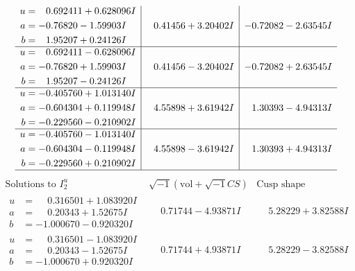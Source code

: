 \documentclass[1p]{elsarticle_modified}
\theoremstyle{definition}
\newcommand{\I}{\sqrt{-1}}
\begin{document}
$$\begin{array}{c|c|c}
\begin{aligned}
u &= \phantom{-}0.692411 + 0.628096 I \\
a &= -0.76820 - 1.59903 I \\
b &= \phantom{-}1.95207 + 0.24126 I\end{aligned}
 & \phantom{-}0.41456 + 3.20402 I & -0.72082 - 2.63545 I \\ \hline\begin{aligned}
u &= \phantom{-}0.692411 - 0.628096 I \\
a &= -0.76820 + 1.59903 I \\
b &= \phantom{-}1.95207 - 0.24126 I\end{aligned}
 & \phantom{-}0.41456 - 3.20402 I & -0.72082 + 2.63545 I \\ \hline\begin{aligned}
u &= -0.405760 + 1.013140 I \\
a &= -0.604304 + 0.119948 I \\
b &= -0.229560 - 0.210902 I\end{aligned}
 & \phantom{-}4.55898 + 3.61942 I & \phantom{-}1.30393 - 4.94313 I \\ \hline\begin{aligned}
u &= -0.405760 - 1.013140 I \\
a &= -0.604304 - 0.119948 I \\
b &= -0.229560 + 0.210902 I\end{aligned}
 & \phantom{-}4.55898 - 3.61942 I & \phantom{-}1.30393 + 4.94313 I\\
 \hline 
 \end{array}$$\newpage$$\begin{array}{c|c|c}  
\text{Solutions to }I^u_{2}& \I (\text{vol} + \sqrt{-1}CS) & \text{Cusp shape}\\
 \hline 
\begin{aligned}
u &= \phantom{-}0.316501 + 1.083920 I \\
a &= \phantom{-}0.20343 + 1.52675 I \\
b &= -1.000670 - 0.920320 I\end{aligned}
 & \phantom{-}0.71744 - 4.93871 I & \phantom{-}5.28229 + 3.82588 I \\ \hline\begin{aligned}
u &= \phantom{-}0.316501 - 1.083920 I \\
a &= \phantom{-}0.20343 - 1.52675 I \\
b &= -1.000670 + 0.920320 I\end{aligned}
 & \phantom{-}0.71744 + 4.93871 I & \phantom{-}5.28229 - 3.82588 I \\ \hline\begin{aligned}

\end{aligned}
\end{array}$$
\end{document}
